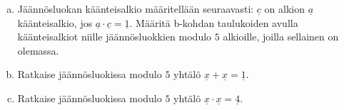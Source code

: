 \begin{enumerate}
\begin{enumerate}[a)]
\item Jäännösluokan käänteisalkio määritellään seuraavasti: $\underline{c}$ on alkion $\underline{a}$ käänteisalkio, jos $\underline{a} \cdot \underline{c} = \underline{1}$. Määritä b-kohdan taulukoiden avulla käänteisalkiot niille jäännösluokkien modulo $5$ alkioille, joilla sellainen on olemassa.
\item Ratkaise jäännösluokissa modulo $5$ yhtälö $\underline{x}+\underline{x}=\underline{1}$.
\item Ratkaise jäännösluokissa modulo $5$ yhtälö $\underline{x}\cdot \underline{x}=\underline{4}$.
\end{enumerate}

\end{enumerate}

\newpage
